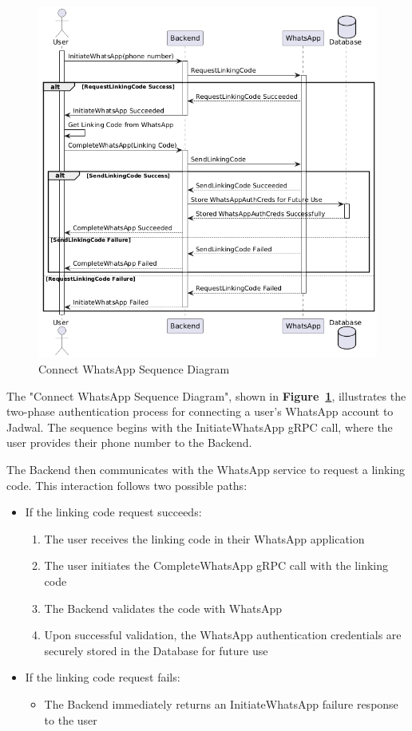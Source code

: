 \begin{figure}[!h]
  \centering
  \includegraphics[width=\textwidth]{images/docs/diagrams/sequence-diagrams/all-sequence-diagrams/Connect WhatsApp.png}
  \caption{Connect WhatsApp Sequence Diagram}
  \label{fig:seq/connect-whatsapp}
\end{figure}

The "Connect WhatsApp Sequence Diagram", shown in \textbf{Figure~\ref{fig:seq/connect-whatsapp}}, illustrates the two-phase authentication process for connecting a user's WhatsApp account to Jadwal. The sequence begins with the InitiateWhatsApp gRPC call, where the user provides their phone number to the Backend.

The Backend then communicates with the WhatsApp service to request a linking code. This interaction follows two possible paths:

\begin{itemize}
  \item If the linking code request succeeds:
        \begin{enumerate}
          \item The user receives the linking code in their WhatsApp application
          \item The user initiates the CompleteWhatsApp gRPC call with the linking code
          \item The Backend validates the code with WhatsApp
          \item Upon successful validation, the WhatsApp authentication credentials are securely stored in the Database for future use
        \end{enumerate}
  \item If the linking code request fails:
        \begin{itemize}
          \item The Backend immediately returns an InitiateWhatsApp failure response to the user
        \end{itemize}
\end{itemize}

